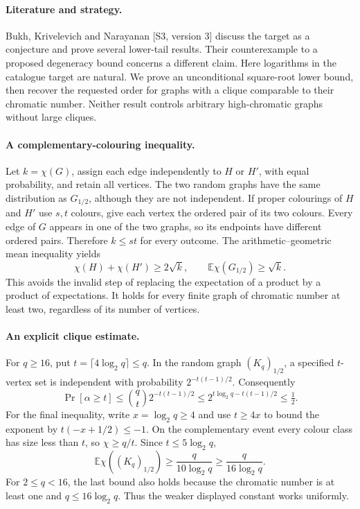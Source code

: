 \documentclass[11pt,a4paper]{article}
\begin{document}
\paragraph{Literature and strategy.}
Bukh, Krivelevich and Narayanan [S3, version 3] discuss the target as a conjecture and prove several lower-tail results. Their counterexample to a proposed degeneracy bound concerns a different claim. Here logarithms in the catalogue target are natural. We prove an unconditional square-root lower bound, then recover the requested order for graphs with a clique comparable to their chromatic number. Neither result controls arbitrary high-chromatic graphs without large cliques.

\paragraph{A complementary-colouring inequality.}
Let $k=\chi(G)$, assign each edge independently to $H$ or $H'$, with equal probability, and retain all vertices. The two random graphs have the same distribution as $G_{1/2}$, although they are not independent. If proper colourings of $H$ and $H'$ use $s,t$ colours, give each vertex the ordered pair of its two colours. Every edge of $G$ appears in one of the two graphs, so its endpoints have different ordered pairs. Therefore $k\le st$ for every outcome. The arithmetic--geometric mean inequality yields
\[
 \chi(H)+\chi(H')\ge2\sqrt{k},\qquad
 \mathbb E\chi(G_{1/2})\ge\sqrt{k}.
\]
This avoids the invalid step of replacing the expectation of a product by a product of expectations. It holds for every finite graph of chromatic number at least two, regardless of its number of vertices.

\paragraph{An explicit clique estimate.}
For $q\ge16$, put $t=\lceil4\log_2q\rceil\le q$. In the random graph $(K_q)_{1/2}$, a specified $t$-vertex set is independent with probability $2^{-t(t-1)/2}$. Consequently
\[
 \Pr[\alpha\ge t]\le\binom qt2^{-t(t-1)/2}
 \le 2^{t\log_2q-t(t-1)/2}\le\tfrac12.
\]
For the final inequality, write $x=\log_2q\ge4$ and use $t\ge4x$ to bound the exponent by $t(-x+1/2)\le-1$. On the complementary event every colour class has size less than $t$, so $\chi\ge q/t$. Since $t\le5\log_2q$,
\[
 \mathbb E\chi((K_q)_{1/2})\ge\frac{q}{10\log_2q}
 \ge\frac{q}{16\log_2q}.
\]
For $2\le q<16$, the last bound also holds because the chromatic number is at least one and $q\le16\log_2q$. Thus the weaker displayed constant works uniformly.
\end{document}
